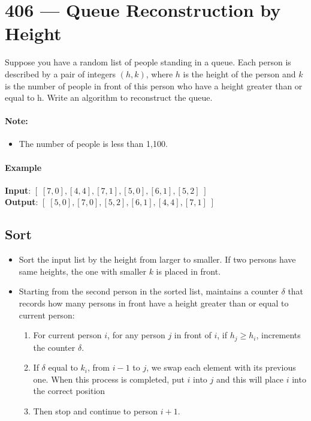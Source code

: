 \section{406 --- Queue Reconstruction by Height}
Suppose you have a random list of people standing in a queue. Each person is described by a pair of integers $(h, k)$, where $h$ is the height of the person and $k$ is the number of people in front of this person who have a height greater than or equal to h. Write an algorithm to reconstruct the queue.

\paragraph{Note:}
\begin{itemize}
\item The number of people is less than 1,100.
\end{itemize}

\paragraph{Example}

\begin{flushleft}
\textbf{Input}: $[\; [7,0], [4,4], [7,1], [5,0], [6,1], [5,2]\;]$
\\
\textbf{Output}: $[\;[5,0], [7,0], [5,2], [6,1], [4,4], [7,1]\;]$
\end{flushleft}

\subsection{Sort}
\begin{itemize}
\item Sort the input list by the height from larger to smaller. If two persons have same heights, the one with smaller $k$ is placed in front.
\item Starting from the second person in the sorted list, maintains a counter $\delta$ that records how many persons in front have a height greater than or equal to current person:
\begin{enumerate}
\item For current person $i$, for any person $j$ in front of $i$, if $h_j \geq h_i$, increments the counter $\delta$. 
\item If $\delta$ equal to $k_i$, from $i-1$ to $j$, we swap each element with its previous one. When this process is completed, put $i$ into $j$ and this will place $i$ into the correct position
\item Then stop and continue to person $i+1$.
\end{enumerate}
\end{itemize}

